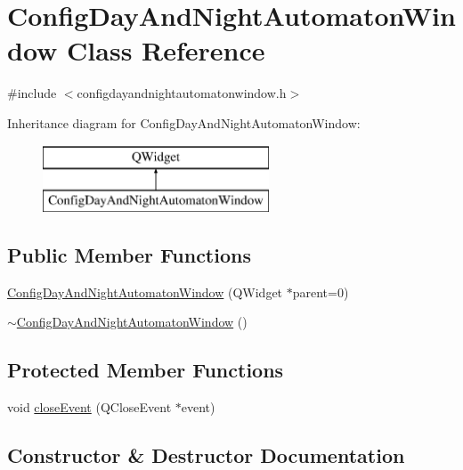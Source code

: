 \hypertarget{class_config_day_and_night_automaton_window}{}\section{Config\+Day\+And\+Night\+Automaton\+Window Class Reference}
\label{class_config_day_and_night_automaton_window}


{\ttfamily \#include $<$configdayandnightautomatonwindow.\+h$>$}

Inheritance diagram for Config\+Day\+And\+Night\+Automaton\+Window\+:\begin{figure}[H]
\begin{center}
\leavevmode
\includegraphics[height=2.000000cm]{class_config_day_and_night_automaton_window}
\end{center}
\end{figure}
\subsection*{Public Member Functions}
\begin{DoxyCompactItemize}
\item 
\mbox{\hyperlink{class_config_day_and_night_automaton_window_a66a893594134674742e5cf8b0a69be48}{Config\+Day\+And\+Night\+Automaton\+Window}} (Q\+Widget $\ast$parent=0)
\item 
\mbox{\hyperlink{class_config_day_and_night_automaton_window_af191304d805ddba8241964c96ceed0d1}{$\sim$\+Config\+Day\+And\+Night\+Automaton\+Window}} ()
\end{DoxyCompactItemize}
\subsection*{Protected Member Functions}
\begin{DoxyCompactItemize}
\item 
void \mbox{\hyperlink{class_config_day_and_night_automaton_window_adb552f195a548174fcba66d5ed44bfe8}{close\+Event}} (Q\+Close\+Event $\ast$event)
\end{DoxyCompactItemize}


\subsection{Constructor \& Destructor Documentation}
\mbox{\label{class_config_day_and_night_automaton_window_a66a893594134674742e5cf8b0a69be48}} 
